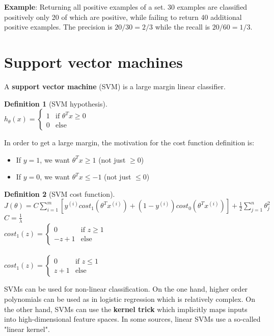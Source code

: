 \documentclass{report}
\newtheorem{definition}{Definition}[section]
\begin{document}
{\bf Example}: Returning all positive examples of a set. 30 examples are classified positively only 20 of which are positive, while failing to return 40 additional positive examples. The precision is $20/30 = 2/3$ while the recall is $20/60 = 1/3$.

\section{Support vector machines}
A {\bf support vector machine} (SVM) is a large margin linear classifier.
\begin{definition}[SVM hypothesis]~\\
$h_{\theta}(x) =
\left\{
\begin{array}{lll}
1  & \mbox{if } \theta^Tx \ge 0 \\
0  & \mbox{else}
\end{array}
\right.$ \\
\end{definition}

In order to get a large margin, the motivation for the cost function definition is:
\begin{itemize}
\item If $y=1$, we want $\theta^Tx\ge 1$ (not just $\ge 0$)
\item If $y=0$, we want $\theta^Tx\le -1$ (not just $\le 0$)
\end{itemize}

\begin{definition}[SVM cost function]~\\
$J(\theta)=C\sum_{i=1}^m[y^{(i)}cost_1(\theta^Tx^{(i)})+(1-y^{(i)})cost_0(\theta^Tx^{(i)})]+\frac{1}{2}\sum_{j=1}^n\theta_j^2$
\\
$C = \frac{1}{\lambda}$
\\
$cost_1(z)=
\left\{
\begin{array}{lll}
0  & \mbox{if } z \ge 1 \\
-z + 1  & \mbox{else}
\end{array}
\right.$ \\
\\
$cost_1(z)=
\left\{
\begin{array}{lll}
0  & \mbox{if } z \le 1 \\
z + 1  & \mbox{else}
\end{array}
\right.$ \\
\end{definition}

SVMs can be used for non-linear classification. On the one hand, higher order polynomials can be used as in logistic regression which is relatively complex. On the other hand, SVMs can use the {\bf kernel trick} which implicitly maps inputs into high-dimensional feature spaces. In some sources, linear SVMs use a so-called "linear kernel".
\end{document}
